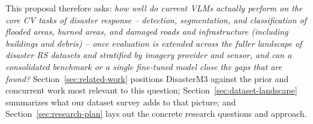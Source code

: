 This proposal therefore asks: \emph{how well do current VLMs actually perform
on the core CV tasks of disaster response -- detection, segmentation, and
classification of flooded areas, burned areas, and damaged roads and
infrastructure (including buildings and debris) -- once evaluation is
extended across the fuller landscape of disaster RS datasets and stratified
by imagery provider and sensor, and can a consolidated benchmark or a single
fine-tuned model close the gaps that are found?} Section~\ref{sec:related-work}
positions DisasterM3 against the prior and concurrent work most relevant to
this question; Section~\ref{sec:dataset-landscape} summarizes what our
dataset survey adds to that picture; and Section~\ref{sec:research-plan}
lays out the concrete research questions and approach.
